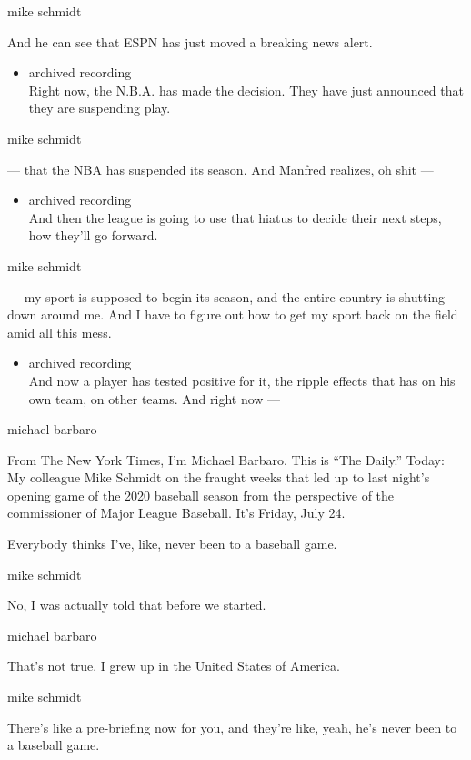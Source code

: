 mike schmidt

And he can see that ESPN has just moved a breaking news alert.

\begin{itemize}
\tightlist
\item
  archived recording\\
  Right now, the N.B.A. has made the decision. They have just announced
  that they are suspending play.
\end{itemize}

mike schmidt

--- that the NBA has suspended its season. And Manfred realizes, oh shit
---

\begin{itemize}
\tightlist
\item
  archived recording\\
  And then the league is going to use that hiatus to decide their next
  steps, how they'll go forward.
\end{itemize}

mike schmidt

--- my sport is supposed to begin its season, and the entire country is
shutting down around me. And I have to figure out how to get my sport
back on the field amid all this mess.

\begin{itemize}
\tightlist
\item
  archived recording\\
  And now a player has tested positive for it, the ripple effects that
  has on his own team, on other teams. And right now ---
\end{itemize}

michael barbaro

From The New York Times, I'm Michael Barbaro. This is ``The Daily.''
Today: My colleague Mike Schmidt on the fraught weeks that led up to
last night's opening game of the 2020 baseball season from the
perspective of the commissioner of Major League Baseball. It's Friday,
July 24.

Everybody thinks I've, like, never been to a baseball game.

mike schmidt

No, I was actually told that before we started.

michael barbaro

That's not true. I grew up in the United States of America.

mike schmidt

There's like a pre-briefing now for you, and they're like, yeah, he's
never been to a baseball game.

